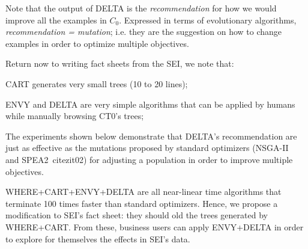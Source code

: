Note that the output of DELTA is the {\em recommendation} for
how we would improve all the examples in $C_0$. Expressed in terms
of evolutionary algorithms, {\em recommendation = mutation}; i.e. they
are the
suggestion on how to change examples in order to optimize
multiple objectives.

Return now to writing fact sheets from the SEI, we note that:
\bi
\item
CART generates very small trees (10 to 20 lines);
\item
ENVY and DELTA are very simple algorithms
that can be applied by humans while manually browsing CT0's trees;
\item
The experiments shown below demonstrate that DELTA's recommendation are just as effective
as the mutations proposed by standard 
optimizers 
(NSGA-II~\cite{deb00a} and SPEA2~cite{zit02}) for adjusting a
population in order to improve multiple objectives.
\item
WHERE+CART+ENVY+DELTA are all near-linear time algorithms
that terminate 100 times faster than standard optimizers.
\ei
Hence, we propose a modification to SEI's fact sheet:
they should old the trees
generated by WHERE+CART. From these, 
business users can apply ENVY+DELTA in order to
explore for themselves the effects in SEI's data.


